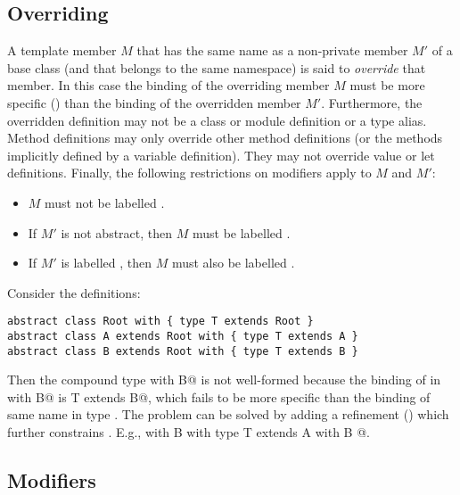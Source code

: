 \documentclass[11pt]{report}
\newcommand{\ifqualified}[1]{}
\newcommand{\iffinaltype}[1]{}
\begin{document}
\subsection{Overriding}
\label{sec:overriding}

A template member $M$ that has the same \ifqualified{qualified} name as a
non-private member $M'$ of a base class (and that belongs to the same
namespace) is said to {\em override} that member.  In this case the
binding of the overriding member $M$ must be more specific
() than the binding of the overridden member $M'$.
Furthermore, the overridden definition may not be a class or module
definition or a type alias.  Method definitions may only override
other method definitions (or the methods implicitly defined by a
variable definition). They may not override value or let definitions.
Finally, the following restrictions on modifiers apply to $M$ and
$M'$:
\begin{itemize}
\item
$M$ must not be labelled \verb@private@.
\item
If $M'$ is not abstract, then $M$ must be labelled \verb@override@.
\item
If $M'$ is labelled \verb@protected@, then $M$ must also be
labelled \verb@protected@.
\iffinaltype{
\item
$M'$ may be labelled \verb@final@ only if it is an abstract type
binding.
}
\end{itemize}

\example\label{ex:compound-a}
Consider the definitions:
\begin{verbatim}
abstract class Root with { type T extends Root }
abstract class A extends Root with { type T extends A }
abstract class B extends Root with { type T extends B }
\end{verbatim}
Then the compound type \verb@A with B@ is not well-formed because the
binding of \verb@T@ in \verb@A with B@ is
\verb@type T extends B@,
which fails to be more specific than the binding of same name in type
\verb@A@. The problem can be solved by adding a refinement
() which further constrains
\verb@T@. E.g., \verb@A with B with { type T extends A with B }@.

\subsection{Modifiers}
\label{sec:modifiers}
\end{document}
